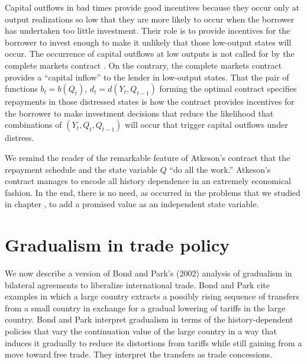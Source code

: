 Capital outflows in bad times
provide good incentives because they occur only at output
realizations so low that they are more likely  to occur when
the borrower has undertaken too little investment.   Their role is to
provide incentives for the borrower to invest enough
to make it unlikely that those low-output states will occur.
The occurrence of
 capital outflows at low outputs is not
called for by
the complete markets contract . On the contrary,
the complete markets
contract provides
a ``capital inflow'' to the lender in low-output states.
That the pair of functions
 $b_t = b(Q_t)$, $d_t = d(Y_t, Q_{t-1})$ forming the optimal
contract  specifies repayments in those distressed  states is how the
contract provides incentives for the borrower to make
investment decisions that reduce the likelihood that combinations of
$(Y_t, Q_t, Q_{t-1})$ will occur that
trigger capital outflows under distress.

 We remind the reader of the remarkable feature of Atkeson's
contract that the repayment schedule and the state
variable $Q$ ``do all the work.''  Atkeson's contract
manages to encode all history dependence in an extremely
economical fashion.  In the end, there is no need, as occurred
in the problems that we studied in chapter ,
to add a promised value as an independent state variable.
%



  
\section{Gradualism in trade policy}

We now describe a version of Bond and Park's (2002) analysis
of gradualism in bilateral agreements to liberalize international trade.
Bond and Park cite examples in which a large country extracts a possibly
rising sequence of transfers  from a small country in exchange for a gradual
lowering of tariffs in the large country.  Bond and Park interpret
gradualism in terms of the history-dependent policies that vary
the continuation value of the large country in a way that induces it gradually
to reduce its distortions from tariffs while still gaining from a move toward
free trade.  They interpret the transfers as trade concessions.

